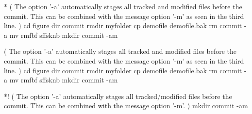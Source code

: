 {}
\begin{tcbbashbox}*%
(
    The option '-a' automatically stages all tracked and modified files before the commit.
    This can be combined with the message option '-m' as seen in the third line.
)
    cd figure
    dir commit
    rmdir myfolder
    cp demofile demofile.bak
    rm commit -a
    mv rmfbf sffsknb
    mkdir commit -am
\end{tcbbashbox}
\begin{tcbbashbox}[hello]%
(
    The option '-a' automatically stages all tracked and modified files before the commit.
    This can be combined with the message option '-m' as seen in the third line.
)
    cd figure
    dir commit
    rmdir myfolder
    cp demofile demofile.bak
    rm commit -a
    mv rmfbf sffsknb
    mkdir commit -am
\end{tcbbashbox}
\begin{tcbbashbox}*!%
(
    The option '-a' automatically stages all tracked/modified files before the commit.
    This can be combined with the message option '-m'.
)
    mkdir commit -am%
\end{tcbbashbox}
